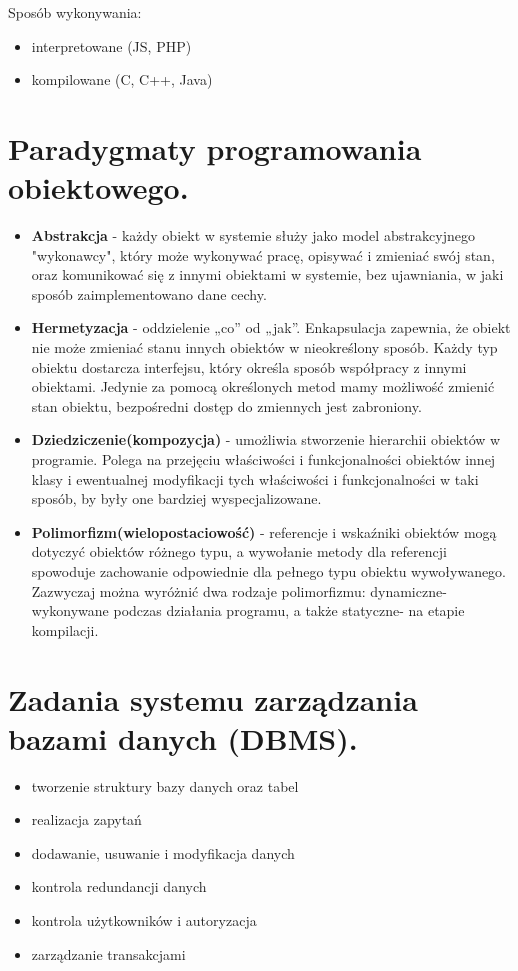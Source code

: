 \documentclass[12pt,a4paper]{article}
\begin{document}
	Sposób wykonywania:
		\begin{itemize}
			\item interpretowane (JS, PHP)
			\item kompilowane (C, C++, Java)
		\end{itemize}

	\section{Paradygmaty programowania obiektowego.}
	\begin{itemize}
		\item \textbf{Abstrakcja} - każdy obiekt w systemie służy jako model abstrakcyjnego "wykonawcy", który może wykonywać pracę, opisywać i zmieniać swój stan, oraz komunikować się z innymi obiektami w systemie, bez ujawniania, w jaki sposób zaimplementowano dane cechy.
		
		\item \textbf{Hermetyzacja} - oddzielenie „co” od „jak”. Enkapsulacja zapewnia, że obiekt nie może zmieniać stanu innych obiektów w nieokreślony sposób. Każdy typ obiektu dostarcza interfejsu, który określa sposób współpracy z innymi obiektami. Jedynie za pomocą określonych metod mamy możliwość zmienić stan obiektu, bezpośredni dostęp do zmiennych jest zabroniony.
		
		\item \textbf{Dziedziczenie(kompozycja)} - umożliwia stworzenie hierarchii obiektów w programie. Polega na przejęciu właściwości i funkcjonalności obiektów innej klasy i ewentualnej modyfikacji tych właściwości i funkcjonalności w taki sposób, by były one bardziej wyspecjalizowane.
		
		\item \textbf{Polimorfizm(wielopostaciowość)} - referencje i wskaźniki obiektów mogą dotyczyć obiektów różnego typu, a wywołanie metody dla referencji spowoduje zachowanie odpowiednie dla pełnego typu obiektu wywoływanego. Zazwyczaj można wyróżnić dwa rodzaje polimorfizmu: dynamiczne- wykonywane podczas działania programu, a także statyczne- na etapie kompilacji.
	\end{itemize}

	\section{Zadania systemu zarządzania bazami danych (DBMS).}
	\begin{itemize}
		\item tworzenie struktury bazy danych oraz tabel
		\item realizacja zapytań
		\item dodawanie, usuwanie i modyfikacja danych
		\item kontrola redundancji danych
		\item kontrola użytkowników i autoryzacja
		\item zarządzanie transakcjami
	\end{itemize}
\end{document}
